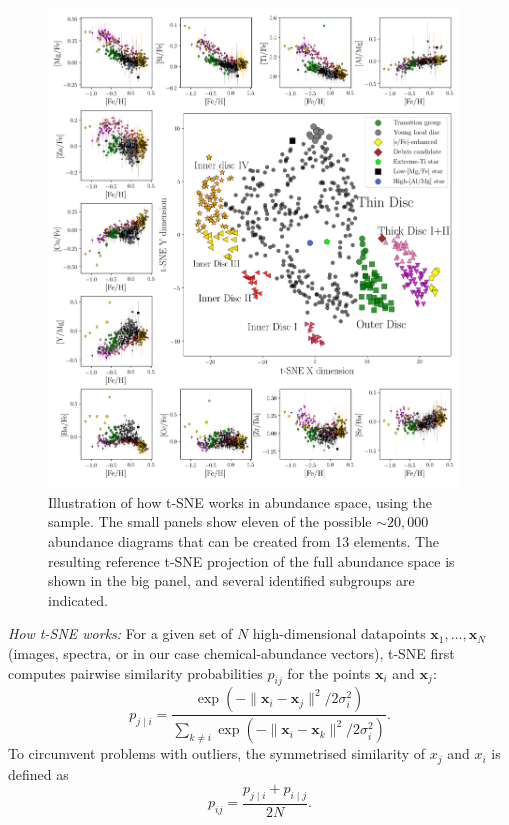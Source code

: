 \documentclass{aa}  %
\begin{document}
\begin{figure}\centering
 \includegraphics[width=0.97\textwidth]{im/harps_tsne-abundsplot_teffcut.png}
\caption{Illustration of how t-SNE works in abundance space, using the \citet{DelgadoMena2017} sample. The small panels show eleven of the possible $\sim20,000$ abundance diagrams that can be created from 13 elements. The resulting reference t-SNE projection of the full abundance space is shown in the big panel, and several identified subgroups are indicated.}
\label{harps0}
\end{figure}

{\it How t-SNE works:} For a given set of $N$ high-dimensional datapoints $\mathbf{x}_1, \dots, \mathbf{x}_N$ (images, spectra, or in our case chemical-abundance vectors), t-SNE first computes pairwise similarity probabilities $p_{ij}$ for the points $\mathbf{x}_i$ and $\mathbf{x}_j$:
$$p_{j\mid i} = \frac{\exp(-\lVert\mathbf{x}_i - \mathbf{x}_j\rVert^2 / 2\sigma_i^2)}{\sum_{k \neq i} \exp(-\lVert\mathbf{x}_i - \mathbf{x}_k\rVert^2 / 2\sigma_i^2)}.$$
To circumvent problems with outliers, the symmetrised similarity of $x_j$ and $x_i$ is defined as 
$$p_{ij} = \frac{p_{j\mid i} + p_{i\mid j}}{2N}.$$
\end{document}
